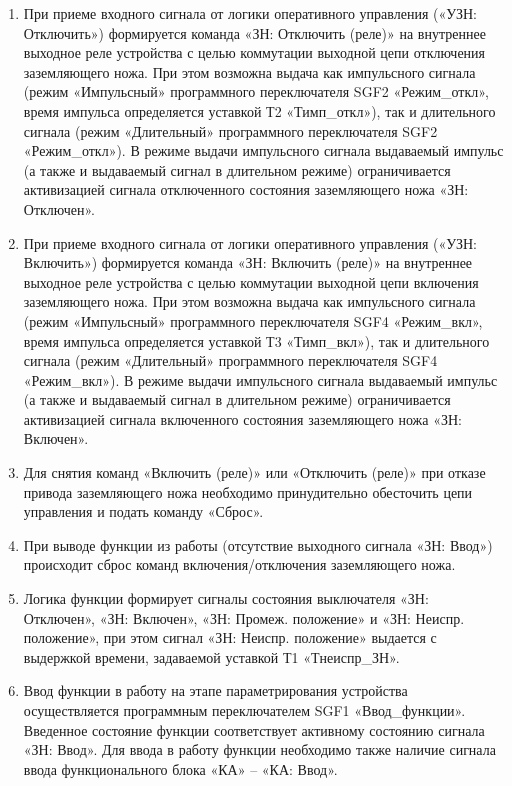 \begin{enumerate}
\begin{enumerate}
\item
При приеме входного сигнала от логики оперативного управления («УЗН: Отключить») формируется команда «ЗН: Отключить (реле)» на внутреннее выходное реле устройства с целью коммутации выходной цепи отключения заземляющего ножа. При этом возможна выдача как импульсного сигнала (режим «Импульсный» программного переключателя SGF2 «Режим\_откл», время импульса определяется уставкой Т2 «Тимп\_откл»), так и длительного сигнала (режим «Длительный» программного переключателя SGF2 «Режим\_откл»). В режиме выдачи импульсного сигнала выдаваемый импульс (а также и выдаваемый сигнал в длительном режиме) ограничивается активизацией сигнала отключенного состояния заземляющего ножа «ЗН: Отключен».

\item
При приеме входного сигнала от логики оперативного управления («УЗН: Включить») формируется команда «ЗН: Включить (реле)» на внутреннее выходное реле устройства с целью коммутации выходной цепи включения заземляющего ножа. При этом возможна выдача как импульсного сигнала (режим «Импульсный» программного переключателя SGF4 «Режим\_вкл», время импульса определяется уставкой Т3 «Тимп\_вкл»), так и длительного сигнала (режим «Длительный» программного переключателя SGF4 «Режим\_вкл»). В режиме выдачи импульсного сигнала выдаваемый импульс (а также и выдаваемый сигнал в длительном режиме) ограничивается активизацией сигнала включенного состояния заземляющего ножа «ЗН: Включен».

\item
Для снятия команд «Включить (реле)» или «Отключить (реле)» при отказе привода заземляющего ножа необходимо принудительно обесточить цепи управления и подать команду «Сброс».

\item
При выводе функции из работы (отсутствие выходного сигнала «ЗН: Ввод») происходит сброс команд включения/отключения заземляющего ножа.

\item
Логика функции формирует сигналы состояния выключателя «ЗН: Отключен», «ЗН: Включен», «ЗН: Промеж. положение» и «ЗН: Неиспр. положение», при этом сигнал «ЗН: Неиспр. положение» выдается с выдержкой времени, задаваемой уставкой Т1 «Тнеиспр\_ЗН».

\item
Ввод функции в работу на этапе параметрирования устройства осуществляется программным переключателем SGF1 «Ввод\_функции». Введенное состояние функции соответствует активному состоянию сигнала «ЗН: Ввод». Для ввода в работу функции необходимо также наличие сигнала ввода функционального блока «КА» -- «КА: Ввод».


\end{enumerate}
\end{enumerate}
